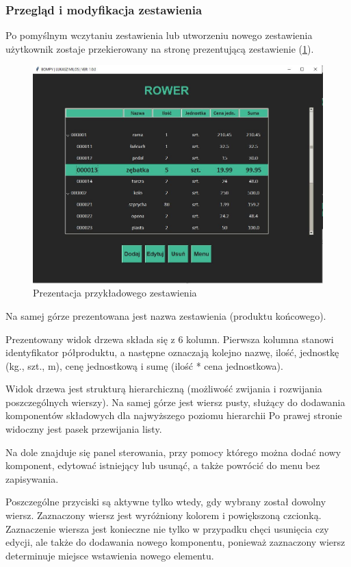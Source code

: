 \documentclass[12pt,twoside]{article}
\begin{document}
\subsubsection*{Przegląd i modyfikacja zestawienia}
Po pomyślnym wczytaniu zestawienia lub utworzeniu nowego zestawienia użytkownik zostaje przekierowany na stronę prezentującą zestawienie (\ref{fig:app:bom_presentation}).

\begin{figure}[h]
	\centering
	\includegraphics[width=\textwidth]{figures/app/bom_presentation.jpg}
	\caption{Prezentacja przykładowego zestawienia}
\label{fig:app:bom_presentation}
\end{figure}

Na samej górze prezentowana jest nazwa zestawienia (produktu końcowego).

Prezentowany widok drzewa składa się z 6 kolumn. Pierwsza kolumna stanowi identyfikator półproduktu, a następne oznaczają kolejno nazwę, ilość, jednostkę (kg., szt., m), cenę jednostkową i sumę (ilość * cena jednostkowa).

Widok drzewa jest strukturą hierarchiczną (możliwość zwijania i rozwijania poszczególnych wierszy). Na samej górze jest wiersz pusty, służący do dodawania komponentów składowych dla najwyższego poziomu hierarchii Po prawej stronie widoczny jest pasek przewijania listy.

Na dole znajduje się panel sterowania, przy pomocy którego można dodać nowy komponent, edytować istniejący lub usunąć, a także powrócić do menu bez zapisywania.

Poszczególne przyciski są aktywne tylko wtedy, gdy wybrany został dowolny wiersz. Zaznaczony wiersz jest wyróżniony kolorem i powiększoną czcionką. Zaznaczenie wiersza jest konieczne nie tylko w przypadku chęci usunięcia czy edycji, ale także do dodawania nowego komponentu, ponieważ zaznaczony wiersz determinuje miejsce wstawienia nowego elementu.
\end{document}
